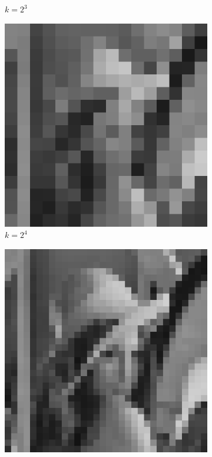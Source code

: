 \begin{figure}[H]
\begin{subfigure}[b]{0.3\textwidth}
        \caption{$k = 2^3$}
    \end{subfigure}
    \hfill
    \begin{subfigure}[b]{0.3\textwidth}
        \centering
        \includegraphics[width=\textwidth]{problem1/image_lena_24bit_16.bmp}
        \caption{$k = 2^4$}
    \end{subfigure}
    \hfill
    \begin{subfigure}[b]{0.3\textwidth}
        \centering
        \includegraphics[width=\textwidth]{problem1/image_lena_24bit_32.bmp}

\end{subfigure}
\end{figure}

